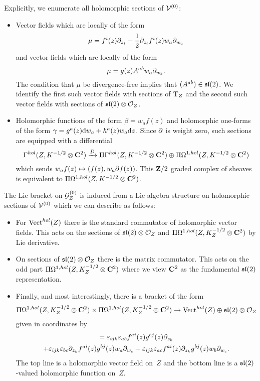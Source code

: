 Explicitly, we enumerate all holomorphic sections of $\mathcal V^{(0)}$:
\begin{itemize}
\item Vector fields which are locally of the form 
\[
\mu = f^i(z) \partial_{z_i} - \frac12 \partial_{z_i} f^i(z) w_a \partial_{w_a}
\]
and vector fields which are locally of the form
\[
\mu = g(z) A^{ab} w_a \partial_{w_b}.
\]
The condition that $\mu$ be divergence-free implies that $(A^{ab}) \in \mathfrak{sl}(2)$.
We identify the first such vector fields with sections of ${\rm T}_Z$ and the second such vector fields with sections of $\mathfrak{sl}(2) \otimes \mathcal O_Z$. 
\item Holomorphic functions of the form $\beta = w_a f(z)$ and holomorphic one-forms of the form $\gamma = g^{a}(z) {\rm d} w_a + h^{a} (z) w_a {\rm d} z$. 
Since $\partial$ is weight zero, such sections are equipped with a differential 
\[
\Gamma^{hol}(Z, K^{-1/2}\otimes \mathbf{C}^2) \xrightarrow{D} \Pi \Gamma^{hol}(Z, K^{-1/2} \otimes \mathbf{C}^2) \oplus \Pi\Omega^{1,hol}(Z, K^{-1/2}\otimes \mathbf{C}^2) 
\]
which sends $w_a f(z) \mapsto (f(z) , w_a \partial f (z))$. 
This $\mathbf{Z}/2$ graded complex of sheaves is equivalent to $\Pi\Omega^{1,hol}(Z, K^{-1/2}\otimes \mathbf{C}^2)$. 
\end{itemize}

The Lie bracket on $\mathcal G_Z^{(0)}$ is induced from a Lie algebra structure on holomorphic sections of $\mathcal V^{(0)}$ which we can describe as follows:
\begin{itemize}
\item For $\operatorname{Vect}^{hol}(Z)$ there is the standard commutator of holomorphic vector fields. 
This acts on the sections of $\mathfrak{sl}(2) \otimes \mathcal O_Z$ and $\Pi\Omega^{1,hol}(Z, K^{-1/2}_Z \otimes \mathbf{C}^2)$ by Lie derivative. 
\item On sections of $\mathfrak{sl}(2) \otimes \mathcal O_Z$ there is the matrix commutator. 
This acts on the odd part $\Pi\Omega^{1,hol}(Z, K^{-1/2}_Z \otimes \mathbf{C}^2)$ where we view $\mathbf{C}^2$ as the fundamental $\mathfrak{sl}(2)$ representation. 
\item Finally, and most interestingly, there is a bracket of the form
\[
\Pi\Omega^{1,hol}(Z, K^{-1/2}_Z \otimes \mathbf{C}^2) \times \Pi\Omega^{1,hol}(Z, K^{-1/2}_Z \otimes \mathbf{C}^2) \to \operatorname{Vect}^{hol}(Z) \oplus \mathfrak{sl}(2) \otimes \mathcal O_Z 
\]
given in coordinates by
\begin{multline}
[f^{ai}(z) w_a \d z_i, g^{bj} (z) w_b \d z_j] = \ep_{ijk} \ep_{ab} f^{ai} (z) g^{bj}(z) \del_{z_k} \\ + \ep_{ijk} \ep_{bc}  \del_{z_k} f^{ai}(z) g^{bj}(z) w_a \del_{w_c} + \ep_{ijk} \ep_{ac} f^{ai}(z) \del_{z_k} g^{bj}(z) w_b \del_{w_c} .
\end{multline}
The top line is a holomorphic vector field on~$Z$ and the bottom line is a $\mathfrak{sl}(2)$-valued holomorphic function on~$Z$.
\end{itemize}


